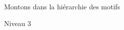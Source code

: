 \documentclass[preview]{standalone}
\begin{document}
\begin{center}
Montons dans la hiérarchie des motifs

    Niveau 3
\end{center}
\end{document}
